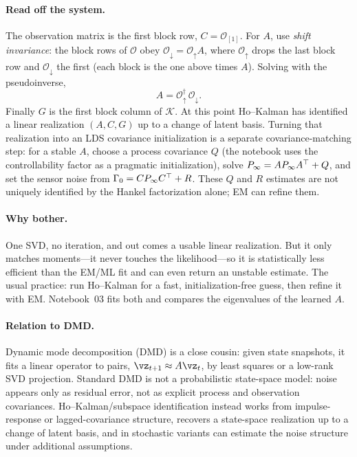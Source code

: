 \documentclass[11pt]{article}
\theoremstyle{plain}
\theoremstyle{definition}
\theoremstyle{remark}
\theoremstyle{definition}
\begin{document}
\paragraph{Read off the system.} The observation matrix is the first block row,
$C = \mathcal{O}_{[1]}$. For $A$, use \emph{shift invariance}: the block rows of
$\mathcal O$ obey $\mathcal{O}_{\downarrow} = \mathcal{O}_{\uparrow} A$, where
$\mathcal{O}_{\uparrow}$ drops the last block row and $\mathcal{O}_{\downarrow}$
the first (each block is the one above times $A$). Solving with the pseudoinverse,
\begin{equation}\label{eq:hk-A}
  A = \mathcal{O}_{\uparrow}^{\dagger}\, \mathcal{O}_{\downarrow} .
\end{equation}
Finally $G$ is the first block column of $\mathcal K$. At this point Ho--Kalman has
identified a linear realization $(A,C,G)$ up to a change of latent basis. Turning
that realization into an LDS covariance initialization is a separate
covariance-matching step: for a stable $A$, choose a process covariance $Q$ (the
notebook uses the controllability factor as a pragmatic initialization), solve
$P_\infty = A P_\infty A{^\top} + Q$, and set the sensor noise from
$\Gamma_0 = C P_\infty C{^\top} + R$. These $Q$ and $R$ estimates are not uniquely
identified by the Hankel factorization alone; EM can refine them.

\paragraph{Why bother.} One SVD, no iteration, and out comes a usable linear
realization. But it only matches moments---it never touches the
likelihood---so it is statistically less efficient than the EM/ML fit and can
even return an unstable estimate. The usual practice: run Ho--Kalman for a fast,
initialization-free guess, then refine it with EM. Notebook~03 fits both and
compares the eigenvalues of the learned $A$.

\paragraph{Relation to DMD.} Dynamic mode decomposition (DMD) is a close cousin:
given state snapshots, it fits a linear operator to pairs, $\vz_{t+1} \approx
A\vz_t$, by least squares or a low-rank SVD projection. Standard DMD is not a
probabilistic state-space model: noise appears only as residual error, not as
explicit process and observation covariances. Ho--Kalman/subspace identification
instead works from impulse-response or lagged-covariance structure, recovers a
state-space realization up to a change of latent basis, and in stochastic variants
can estimate the noise structure under additional assumptions.
\end{document}
